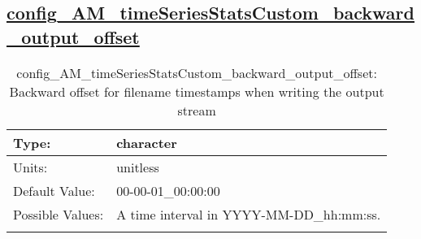 \subsection[config\_AM\_timeSeriesStatsCustom\_backward\_output\_offset]{\hyperref[sec:nm_tab_AM_timeSeriesStatsCustom]{config\_AM\_timeSeriesStatsCustom\_backward\_output\_offset}}
\label{subsec:nm_sec_config_AM_timeSeriesStatsCustom_backward_output_offset}
\begin{center}
\begin{longtable}{| p{2.0in} || p{4.0in} |}
    \hline
    Type: & character \\
    \hline
    Units: & \si{unitless} \\
    \hline
    Default Value: & 00-00-01\_00:00:00 \\
    \hline
    Possible Values: & A time interval in YYYY-MM-DD\_hh:mm:ss. \\
    \hline
    \caption{config\_AM\_timeSeriesStatsCustom\_backward\_output\_offset: Backward offset for filename timestamps when writing the output stream}
\end{longtable}
\end{center}
